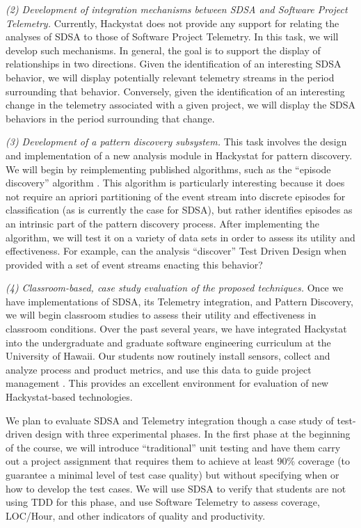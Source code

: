 {\em (2) Development of integration mechanisms between SDSA and Software
Project Telemetry.}  Currently, Hackystat does not provide any support for
relating the analyses of SDSA to those of Software Project Telemetry.  In
this task, we will develop such mechanisms.  In general, the goal is to
support the display of relationships in two directions. Given the
identification of an interesting SDSA behavior, we will display
potentially relevant telemetry streams in the period surrounding that
behavior.  Conversely, given the identification of an interesting change in
the telemetry associated with a given project, we will display the
SDSA behaviors in the period surrounding that change.

{\em (3) Development of a pattern discovery subsystem.}  This task
involves the design and implementation of a new analysis module in
Hackystat for pattern discovery.  We will begin by reimplementing published
algorithms, such as the ``episode discovery'' algorithm
\cite{Heierman04}. This algorithm is particularly interesting because it
does not require an apriori partitioning of the event stream into discrete
episodes for classification (as is currently the case for SDSA), but rather
identifies episodes as an intrinsic part of the pattern discovery process.
After implementing the algorithm, we will test it on a variety of data sets
in order to assess its utility and effectiveness. For example, can the analysis
``discover'' Test Driven Design when provided with a set of event
streams enacting this behavior?  

{\em (4) Classroom-based, case study evaluation of the proposed
techniques.}  Once we have implementations of SDSA, its Telemetry
integration, and Pattern Discovery, we will begin classroom studies to
assess their utility and effectiveness in classroom conditions.  Over the
past several years, we have integrated Hackystat into the undergraduate and
graduate software engineering curriculum at the University of Hawaii. Our
students now routinely install sensors, collect and analyze process
and product metrics, and use this data to guide project management
\cite{csdl2-03-12}.  This provides an excellent environment for evaluation
of new Hackystat-based technologies.

We plan to evaluate SDSA and Telemetry integration though a case study of
test-driven design with three experimental phases.  In the first phase at
the beginning of the course, we will introduce ``traditional'' unit testing
and have them carry out a project assignment that requires them to achieve
at least 90\% coverage (to guarantee a minimal level of test case quality)
but without specifying when or how to develop the test cases.  We will use
SDSA to verify that students are not using TDD for this phase, and use
Software Telemetry to assess coverage, LOC/Hour, and other indicators of
quality and productivity.

